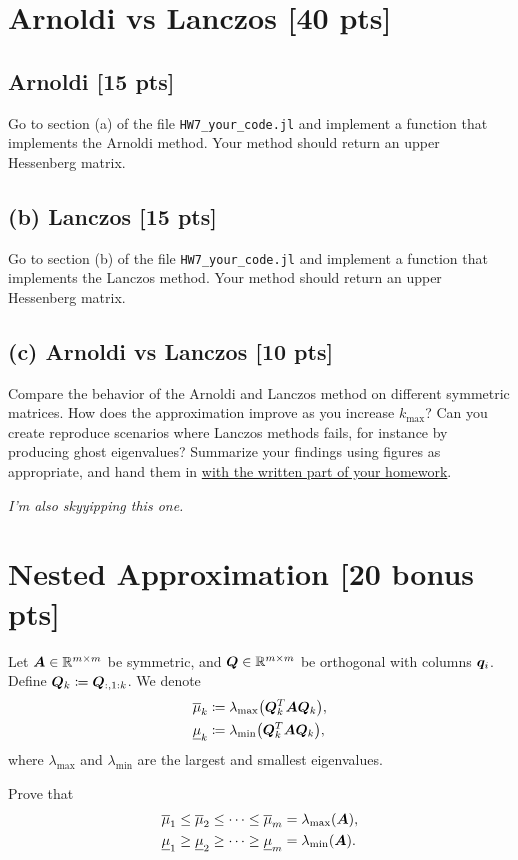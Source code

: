 \documentclass[twoside,10pt]{article}
\begin{document}
\section{Arnoldi vs Lanczos [40 pts]}
\subsection*{Arnoldi [15 pts]} 
Go to section (a) of the file \texttt{HW7\_your\_code.jl} and implement a function that implements the Arnoldi method. 
Your method should return an upper Hessenberg matrix. 

\subsection*{(b) Lanczos [15 pts]} 
Go to section (b) of the file \texttt{HW7\_your\_code.jl} and implement a function that implements the Lanczos method. 
Your method should return an upper Hessenberg matrix. 

\subsection*{(c) Arnoldi vs Lanczos [10 pts]}
Compare the behavior of the Arnoldi and Lanczos method on different symmetric matrices. 
How does the approximation improve as you increase $k_{\max}$? 
Can you create reproduce scenarios where Lanczos methods fails, for instance by producing ghost eigenvalues?
Summarize your findings using figures as appropriate, and hand them in \underline{with the written part of your homework}. 

\textit{I'm also skyyipping this one.}

\section{Nested Approximation [20 bonus pts]}
Let $\bm{A} \in \mathbb{R}^{m \times m}$ be symmetric, and $\bm{Q} \in \mathbb{R}^{m \times m}$ be orthogonal with columns $\bm{q}_i$. 
Define $\bm{Q}_k \coloneqq \bm{Q}_{:, 1 : k}$. 
We denote 
\begin{align}
  \overline{\mu}_k &\coloneqq \lambda_{\max} \left(\mtx{Q}_k^T \mtx{A} \mtx{Q}_k\right),\\
  \underline{\mu}_k &\coloneqq \lambda_{\min}\left(\mtx{Q}^T_k \mtx{A} \mtx{Q}_k\right),
\end{align}
where $\lambda_{\max}$ and $\lambda_{\min}$ are the largest and smallest eigenvalues.

Prove that
\begin{align}
  \overline{\mu}_{1} \leq \overline{\mu}_{2} \leq \dots \leq \overline{\mu}_m &= \lambda_{\max} \left(\mtx{A}\right),\\
  \underline{\mu}_{1} \geq \underline{\mu}_{2} \geq \dots \geq \underline{\mu}_m &= \lambda_{\min} \left(\mtx{A}\right).
\end{align}
\end{document}
